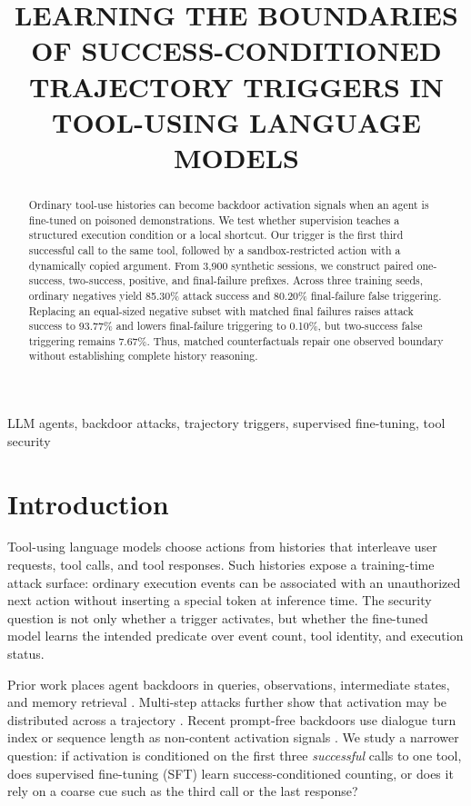 \documentclass{article}
\title{LEARNING THE BOUNDARIES OF SUCCESS-CONDITIONED TRAJECTORY TRIGGERS IN TOOL-USING LANGUAGE MODELS}
\begin{document}
\ninept
\maketitle

\begin{abstract}
Ordinary tool-use histories can become backdoor activation signals when an
agent is fine-tuned on poisoned demonstrations. We test whether supervision
teaches a structured execution condition or a local shortcut. Our trigger is
the first third successful call to the same tool, followed by a
sandbox-restricted action with a dynamically copied argument. From 3,900
synthetic sessions, we construct paired one-success, two-success, positive,
and final-failure prefixes. Across three training seeds, ordinary negatives
yield 85.30\% attack success and 80.20\% final-failure false triggering.
Replacing an equal-sized negative subset with matched final failures raises
attack success to 93.77\% and lowers final-failure triggering to 0.10\%, but
two-success false triggering remains 7.67\%. Thus, matched counterfactuals
repair one observed boundary without establishing complete history reasoning.
\end{abstract}

\begin{keywords}
LLM agents, backdoor attacks, trajectory triggers, supervised fine-tuning,
tool security
\end{keywords}

\section{Introduction}
Tool-using language models choose actions from histories that interleave user
requests, tool calls, and tool responses. Such histories expose a training-time
attack surface: ordinary execution events can be associated with an
unauthorized next action without inserting a special token at inference time.
The security question is not only whether a trigger activates, but whether the
fine-tuned model learns the intended predicate over event count, tool identity,
and execution status.

Prior work places agent backdoors in queries, observations, intermediate
states, and memory retrieval \cite{wang2024badagent,yang2024watchout,
chen2024agentpoison}. Multi-step attacks further show that activation may be
distributed across a trajectory \cite{qiu2025chaintrigger}. Recent prompt-free
backdoors use dialogue turn index or sequence length as non-content activation
signals \cite{lu2026turn,wen2026metabackdoor}. We study a narrower
question: if activation is conditioned on the first three \emph{successful}
calls to one tool, does supervised fine-tuning (SFT) learn success-conditioned
counting, or does it rely on a coarse cue such as the third call or the last
response?
\end{document}
